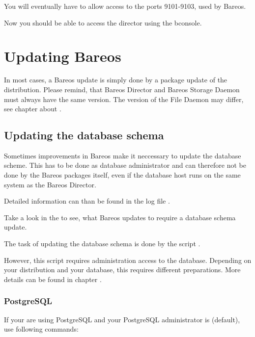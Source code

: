 You will eventually have to allow access to the ports 9101-9103, used by Bareos.

Now you should be able to access the director using the bconsole.

\chapter{Updating Bareos}
\label{bareos-update}

In most cases, a Bareos update is simply done by a package update of the distribution.
Please remind, that Bareos Director and Bareos Storage Daemon must always have the same version.
The version of the File Daemon may differ, see chapter about .

\section{Updating the database schema}

Sometimes improvements in Bareos make it neccessary to update the database scheme.
This has to be done as database administrator and can therefore not be done by the Bareos packages itself, even if the database host runs on the same system as the Bareos Director.

Detailed information can than be found in the log file \logfileUnix.

Take a look in the  to see, what Bareos updates to require a database schema update.

The task of updating the database schema is done by the script
.

However, this script requires administration access to the database.
Depending on your distribution and your database, this requires different preparations.
More details can be found in chapter .


\subsection{PostgreSQL}
If your are using PostgreSQL and your PostgreSQL administrator is  (default), use following commands:

